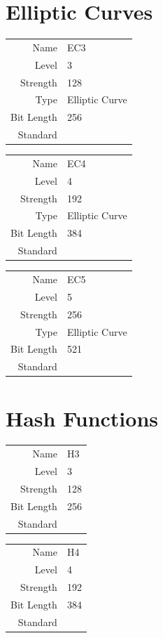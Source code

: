 \documentclass[bibtotoc,halfparskip,oneside]{scrreprt}
\begin{document}
	\section{Elliptic Curves}
	
	\begin{tabularx}{\textwidth}{rX}
		Name & \textsf{EC3} \\
		Level & 3 \\
		Strength & 128 \\
		Type & Elliptic Curve \\
		Bit Length & 256 \\
		Standard & 
	\end{tabularx}
	
	\begin{tabularx}{\textwidth}{rX}
		Name & \textsf{EC4} \\
		Level & 4 \\
		Strength & 192 \\
		Type & Elliptic Curve \\
		Bit Length & 384 \\
		Standard & 
	\end{tabularx}
	
	\begin{tabularx}{\textwidth}{rX}
		Name & \textsf{EC5} \\
		Level & 5 \\
		Strength & 256 \\
		Type & Elliptic Curve \\
		Bit Length & 521 \\
		Standard & 
	\end{tabularx}
	
	
	\section{Hash Functions}
	
	\begin{tabularx}{\textwidth}{rX}
		Name & \textsf{H3} \\
		Level & 3 \\
		Strength & 128 \\
		Bit Length & 256 \\
		Standard & 
	\end{tabularx}
	
	\begin{tabularx}{\textwidth}{rX}
		Name & \textsf{H4} \\
		Level & 4 \\
		Strength & 192 \\
		Bit Length & 384 \\
		Standard & 
	\end{tabularx}
	
\end{document}
